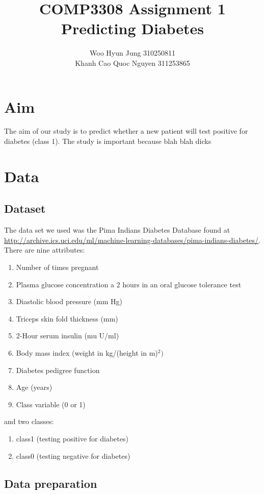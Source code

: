\documentclass{article}
\title{COMP3308 Assignment 1 \\ Predicting Diabetes}
\author{Woo Hyun Jung 310250811 \\  Khanh Cao Quoc Nguyen 311253865}
\date{}
\begin{document}
\maketitle
\thispagestyle{empty}
\newpage

\section{Aim}
The aim of our study is to predict whether a new patient will test positive for diabetes (class 1). The study is important because blah blah dicks

\section{Data}
\subsection{Dataset}
The data set we used was the Pima Indians Diabetes Database found at \url{http://archive.ics.uci.edu/ml/machine-learning-databases/pima-indians-diabetes/}. \\
There are nine attributes: 
\begin{enumerate}[1.]
\item Number of times pregnant
\item Plasma glucose concentration a 2 hours in an oral glucose tolerance test
\item Diastolic blood pressure (mm Hg)
\item Triceps skin fold thickness (mm)
\item 2-Hour serum insulin (mu U/ml)
\item Body mass index (weight in kg/(height in m)$^2)$
\item Diabetes pedigree function
\item Age (years)
\item Class variable (0 or 1)
\end{enumerate} 
and two classes:
\begin{enumerate}[1.]
\item class1 (testing positive for diabetes)
\item class0 (testing negative for diabetes)
\end{enumerate} 

\subsection{Data preparation}
\end{document}
